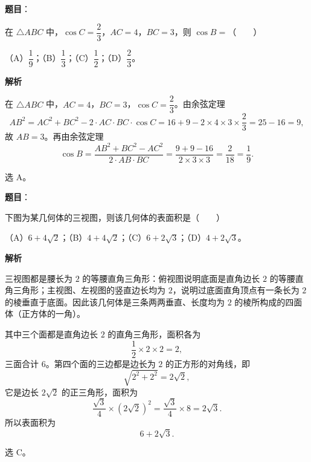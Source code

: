 \begin{answer}

\textbf{题目}：

在 $\triangle ABC$ 中，$\cos C=\dfrac23$，$AC=4$，$BC=3$，则 $\cos B=$\mbox{（　　）}

（A）$\dfrac19$；（B）$\dfrac13$；（C）$\dfrac12$；（D）$\dfrac23$。

\textbf{解析}

在 $\triangle ABC$ 中，$AC=4$，$BC=3$，$\cos C=\dfrac23$。由余弦定理
\nopagebreak[4]
\[AB^2=AC^2+BC^2-2\cdot AC\cdot BC\cdot\cos C=16+9-2\times4\times3\times\frac23=25-16=9,\]
故 $AB=3$。再由余弦定理
\nopagebreak[4]
\[\cos B=\frac{AB^2+BC^2-AC^2}{2\cdot AB\cdot BC}=\frac{9+9-16}{2\times3\times3}=\frac2{18}=\frac19 .\]

选 A。


\end{answer}
\begin{answer}

\textbf{题目}：

下图为某几何体的三视图，则该几何体的表面积是\mbox{（　　）}

（A）$6+4\sqrt2$；（B）$4+4\sqrt2$；（C）$6+2\sqrt3$；（D）$4+2\sqrt3$。
\nopagebreak[4]
\begin{center}\end{center}
\nopagebreak[4]
\textbf{解析}

三视图都是腰长为 $2$ 的等腰直角三角形：俯视图说明底面是直角边长 $2$ 的等腰直角三角形；主视图、左视图的竖直边长均为 $2$，说明过底面直角顶点有一条长为 $2$ 的棱垂直于底面。因此该几何体是三条两两垂直、长度均为 $2$ 的棱所构成的四面体（正方体的一角）。

其中三个面都是直角边长 $2$ 的直角三角形，面积各为
\nopagebreak[4]
\[\frac12\times2\times2=2,\]
三面合计 $6$。第四个面的三边都是边长为 $2$ 的正方形的对角线，即
\nopagebreak[4]
\[\sqrt{2^2+2^2}=2\sqrt2,\]
它是边长 $2\sqrt2$ 的正三角形，面积为
\nopagebreak[4]
\[\frac{\sqrt3}4\times(2\sqrt2)^2=\frac{\sqrt3}4\times8=2\sqrt3 .\]
所以表面积为
\nopagebreak[4]
\[6+2\sqrt3 .\]

选 C。


\end{answer}
